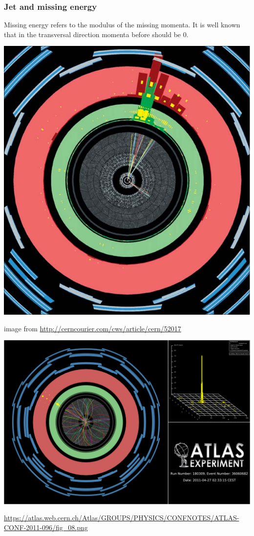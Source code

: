 \documentclass[•]{beamer}
\theoremstyle{remark}
\begin{document}
\begin{frame}[shrink=10]\frametitle{Jet and missing energy}
\begin{block}

Missing energy refers to the modulus of the missing momenta. It is well known that in the transversal direction momenta before should be 0. 
\end{block}
\includegraphics[scale=0.2]{monojet.jpg}


{\tiny image from \url{http://cerncourier.com/cws/article/cern/52017}}
\end{frame}
\begin{frame}



\includegraphics[scale=0.06]{monojetbig.png}


{\tiny \url{https://atlas.web.cern.ch/Atlas/GROUPS/PHYSICS/CONFNOTES/ATLAS-CONF-2011-096/fig_08.png}}


\end{frame}
\end{document}
